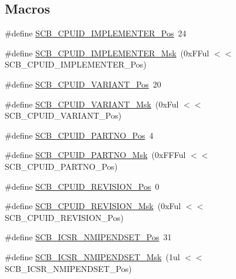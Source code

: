 \subsection*{Macros}
\begin{DoxyCompactItemize}
\item 
\#define \hyperlink{group__CMSIS__CM3__SCB_ga58686b88f94f789d4e6f429fe1ff58cf}{S\+C\+B\+\_\+\+C\+P\+U\+I\+D\+\_\+\+I\+M\+P\+L\+E\+M\+E\+N\+T\+E\+R\+\_\+\+Pos}~24
\item 
\#define \hyperlink{group__CMSIS__CM3__SCB_ga0932b31faafd47656a03ced75a31d99b}{S\+C\+B\+\_\+\+C\+P\+U\+I\+D\+\_\+\+I\+M\+P\+L\+E\+M\+E\+N\+T\+E\+R\+\_\+\+Msk}~(0x\+F\+Ful $<$$<$ S\+C\+B\+\_\+\+C\+P\+U\+I\+D\+\_\+\+I\+M\+P\+L\+E\+M\+E\+N\+T\+E\+R\+\_\+\+Pos)
\item 
\#define \hyperlink{group__CMSIS__CM3__SCB_ga104462bd0815391b4044a70bd15d3a71}{S\+C\+B\+\_\+\+C\+P\+U\+I\+D\+\_\+\+V\+A\+R\+I\+A\+N\+T\+\_\+\+Pos}~20
\item 
\#define \hyperlink{group__CMSIS__CM3__SCB_gad358dfbd04300afc1824329d128b99e8}{S\+C\+B\+\_\+\+C\+P\+U\+I\+D\+\_\+\+V\+A\+R\+I\+A\+N\+T\+\_\+\+Msk}~(0x\+Ful $<$$<$ S\+C\+B\+\_\+\+C\+P\+U\+I\+D\+\_\+\+V\+A\+R\+I\+A\+N\+T\+\_\+\+Pos)
\item 
\#define \hyperlink{group__CMSIS__CM3__SCB_ga705f68eaa9afb042ca2407dc4e4629ac}{S\+C\+B\+\_\+\+C\+P\+U\+I\+D\+\_\+\+P\+A\+R\+T\+N\+O\+\_\+\+Pos}~4
\item 
\#define \hyperlink{group__CMSIS__CM3__SCB_ga98e581423ca016680c238c469aba546d}{S\+C\+B\+\_\+\+C\+P\+U\+I\+D\+\_\+\+P\+A\+R\+T\+N\+O\+\_\+\+Msk}~(0x\+F\+F\+Ful $<$$<$ S\+C\+B\+\_\+\+C\+P\+U\+I\+D\+\_\+\+P\+A\+R\+T\+N\+O\+\_\+\+Pos)
\item 
\#define \hyperlink{group__CMSIS__CM3__SCB_ga3c3d9071e574de11fb27ba57034838b1}{S\+C\+B\+\_\+\+C\+P\+U\+I\+D\+\_\+\+R\+E\+V\+I\+S\+I\+O\+N\+\_\+\+Pos}~0
\item 
\#define \hyperlink{group__CMSIS__CM3__SCB_ga2ec0448b6483f77e7f5d08b4b81d85df}{S\+C\+B\+\_\+\+C\+P\+U\+I\+D\+\_\+\+R\+E\+V\+I\+S\+I\+O\+N\+\_\+\+Msk}~(0x\+Ful $<$$<$ S\+C\+B\+\_\+\+C\+P\+U\+I\+D\+\_\+\+R\+E\+V\+I\+S\+I\+O\+N\+\_\+\+Pos)
\item 
\#define \hyperlink{group__CMSIS__CM3__SCB_ga750d4b52624a46d71356db4ea769573b}{S\+C\+B\+\_\+\+I\+C\+S\+R\+\_\+\+N\+M\+I\+P\+E\+N\+D\+S\+E\+T\+\_\+\+Pos}~31
\item 
\#define \hyperlink{group__CMSIS__CM3__SCB_ga340e3f79e9c3607dee9f2c048b6b22e8}{S\+C\+B\+\_\+\+I\+C\+S\+R\+\_\+\+N\+M\+I\+P\+E\+N\+D\+S\+E\+T\+\_\+\+Msk}~(1ul $<$$<$ S\+C\+B\+\_\+\+I\+C\+S\+R\+\_\+\+N\+M\+I\+P\+E\+N\+D\+S\+E\+T\+\_\+\+Pos)
$$
\end{DoxyCompactItemize}
